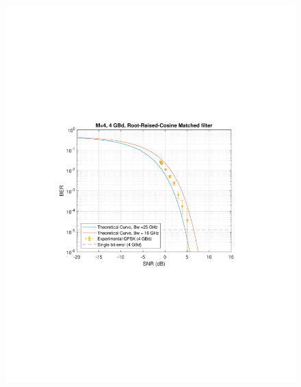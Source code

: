 \begin{refsection}
\begin{figure}[H]
	\centering
	\begin{minipage}{0.43\textwidth}
		\centering
		\includegraphics[clip, trim=4cm 8cm 4cm 8cm, width=1\textwidth]{./sdf/m_qam_system/figures/expResults/4GBdBER20180611.pdf}
		\subcaption{\label{fig:4GBdBER}}
	\end{minipage}
	\begin{minipage}{0.43\textwidth}
		\centering

\end{minipage}
\end{figure}
\end{refsection}
